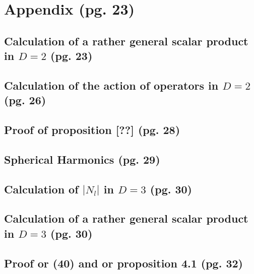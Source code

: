 \documentclass{article}
\begin{document}
\section{Appendix (pg. 23)}

\subsection{Calculation of a rather general scalar product in $D=2$ (pg. 23)}

\subsection{Calculation of the action of operators in $D=2$ (pg. 26)}

\subsection{Proof of proposition [??] (pg. 28)}

\subsection{Spherical Harmonics (pg. 29)}

\subsection{Calculation of $|N_l|$ in $D = 3$ (pg. 30)}

\subsection{Calculation of a rather general scalar product in $D = 3$ (pg. 30)}

\subsection{Proof or (40) and or proposition 4.1 (pg. 32)}
\end{document}
